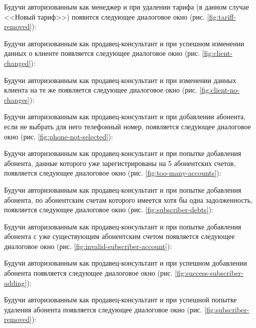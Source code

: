 Будучи авторизованным как менеджер и при удалении тарифа (в данном случае <<Новый тариф>>) появится следующее диалоговое окно (рис. \ref{fig:tariff-removed}):

Будучи авторизованным как продавец-консультант и при успешном изменении данных о клиенте появляется следующее диалоговое окно (рис. \ref{fig:client-changed}):

Будучи авторизованным как продавец-консультант и при изменении данных клиента на те же появляется следующее диалоговое окно (рис. \ref{fig:client-no-changes}):

Будучи авторизованным как продавец-консультант и при добавлении абонента, если не выбрать для него телефонный номер, появляется следующее диалоговое окно (рис. \ref{fig:phone-not-selected}):

Будучи авторизованным как продавец-консультант и при попытке добавления абонента, данные которого уже зарегистрированы на 5 абонентских счетов, появляется следующее диалоговое окно (рис. \ref{fig:too-many-accounts}):

Будучи авторизованным как продавец-консультант и при попытке добавления абонента, по абонентским счетам которого имеется хотя бы одна задолженность, появляется следующее диалоговое окно (рис. \ref{fig:subscriber-debts}):

Будучи авторизованным как продавец-консультант и при попытке добавления абонента с уже существующим абонентским счетом появляется следующее диалоговое окно (рис. \ref{fig:invalid-subscriber-account}):

Будучи авторизованным как продавец-консультант и при успешном добавлении абонента появляется следующее диалоговое окно (рис. \ref{fig:success-subscriber-adding}):

Будучи авторизованным как продавец-консультант и при успешной попытке удаления абонента появляется следующее диалоговое окно (рис. \ref{fig:subscriber-removed}):

